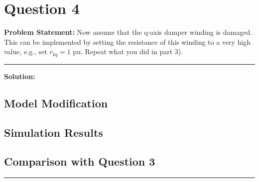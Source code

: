 \clearpage
\section*{Question 4}

\textbf{Problem Statement:} Now assume that the q-axis damper winding is damaged. This can be implemented by setting the resistance of this winding to a very high value, e.g., set $r_{kq} = 1$ pu. Repeat what you did in part 3).

\vspace{1em}
\noindent\rule{\textwidth}{0.4pt}
\vspace{1em}

\textbf{Solution:}

\subsection*{Model Modification}


\subsection*{Simulation Results}


\subsection*{Comparison with Question 3}


\vspace{1em}
\noindent\rule{\textwidth}{0.4pt}
